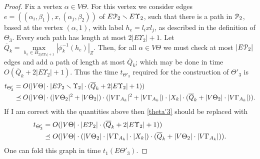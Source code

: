 \documentclass[a4paper,12pt]{article}
\renewcommand{\a}{\alpha }
\renewcommand{\b}{\beta }
\newcommand{\G}{\Gamma }
\newcommand{\T}{\Theta }
\newcommand{\U}{\Upsilon }
\newcommand{\cP}{{\cal{P}}}
\numberwithin{equation}{section}
\numberwithin{figure}{section}
\begin{document}
\begin{proof}
Fix a vertex $\a \in V\T$. For this vertex we consider edges 
$e=((\a_i,\b_1), x,(\a_j,\b_2) )$ of $E\cP_2\smallsetminus E\U_2$, 
such that there 
is a path in $\cP_2$, based at the  vertex $(\a,1)$, with label 
$h_e=l_i x l_j$, as described in the definition of $\T_3$. Every
such path has   length at most  $2 |E \U_2| +1$. Let
$\overline{Q}_k=\max\limits_{h_e \in B_{2|E \U_2|
+1}}|\phi^{-1}_k(h_e)|_Z$. 
Then, for all $\a \in V\T$ we must check at most
$|E\cP_2|$ edges and add a path of length at most $\overline{Q}_k$;
 which may be done   in time $O(\overline{Q}_k+2 |E\U_2| +1)$. 
Thus the time $t_{\T'_3}$ required for the construction of $\T'_3$ 
is 
\begin{equation}\label{theta'3}
\begin{split}
t_{\T'_3} &= O(|V\T|\cdot |E\cP_2\smallsetminus \U_2|\cdot
(\overline{Q}_k+2 |E \U_2| +1))\\ &\preceq O(|V\T|\cdot
(|V\T_2|^2+|V\T_2|)\cdot (|V\G_{A_k}|^2+|V\G_{A_k}|) \cdot |X_k|
\cdot (\overline{Q}_k+|V\T_2|\cdot |V \G_{A_k}|)).
\end{split}
\end{equation}
{\ajd If I am correct with the quantities above then \eqref{theta'3}
should be  replaced with
\[
\begin{split}
t_{\T'_3} &= O(|V\T|\cdot |E\cP_2|\cdot (\overline{Q}_k+2 |E \U_2| +1))\\ 
&\preceq     O(|V\T|\cdot
(|V\T_2|\cdot|V\G_{A_k}|\cdot|X_k|)
\cdot (\overline{Q}_k+|V\T_2|\cdot |V \G_{A_k}|)).
\end{split}
\]
}
One can fold this graph in time $t_1(E\T'_3)$. 


\end{proof}
\end{document}
